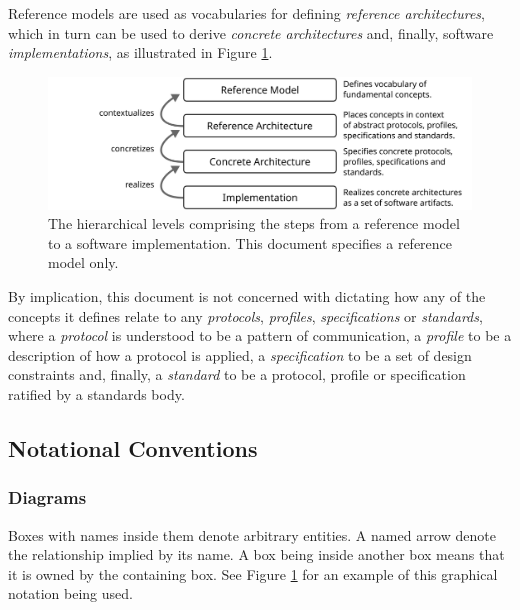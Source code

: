 Reference models are used as vocabularies for defining \textit{reference architectures}, which in turn can be used to derive \textit{concrete architectures} and, finally, software \textit{implementations}, as illustrated in Figure \ref{fig:model-implementation-hierarchy}.

\begin{figure}[ht]
  \centering
  \includegraphics{figures/model-implementation-hierarchy}
  \caption{
    The hierarchical levels comprising the steps from a reference model to a software implementation.
    This document specifies a reference model only.
  }
  \label{fig:model-implementation-hierarchy}
\end{figure}

By implication, this document is not concerned with dictating how any of the concepts it defines relate to any \textit{protocols}, \textit{profiles}, \textit{specifications} or \textit{standards}, where a \textit{protocol} is understood to be a pattern of communication, a \textit{profile} to be a description of how a protocol is applied, a \textit{specification} to be a set of design constraints and, finally, a \textit{standard} to be a protocol, profile or specification ratified by a standards body.

\newpage

\subsection{Notational Conventions}
\label{sec:introduction:conventions}

\subsubsection{Diagrams}

Boxes with names inside them denote arbitrary entities.
A named arrow denote the relationship implied by its name.
A box being inside another box means that it is owned by the containing box.
See Figure \ref{fig:model-implementation-hierarchy} for an example of this graphical notation being used.

